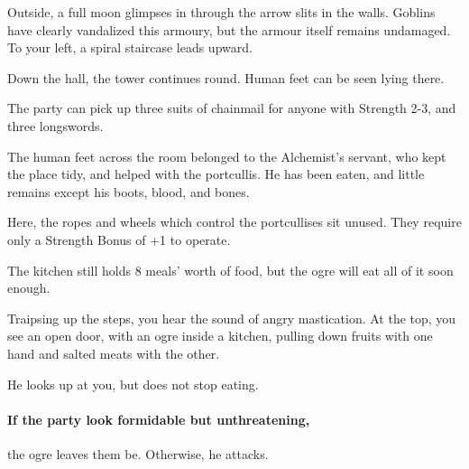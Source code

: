 \begin{multicols}{2}
\begin{boxtext}

  Outside, a full moon glimpses in through the arrow slits in the walls.
  Goblins have clearly vandalized this armoury, but the armour itself remains undamaged.
  To your left, a spiral staircase leads upward.

  Down the hall, the tower continues round.
  Human feet can be seen lying there.

\end{boxtext}


The party can pick up three suits of chainmail for anyone with Strength 2-3, and three longswords.

The human feet across the room belonged to the Alchemist's servant, who kept the place tidy, and helped with the portcullis.
He has been eaten, and little remains except his boots, blood, and bones.


Here, the ropes and wheels which control the portcullises sit unused.
They require only a Strength Bonus of +1 to operate.


The kitchen still holds 8 meals' worth of food, but the ogre will eat all of it soon enough.

\begin{boxtext}

  Traipsing up the steps, you hear the sound of angry mastication.
  At the top, you see an open door, with an ogre inside a kitchen, pulling down fruits with one hand and salted meats with the other.

  He looks up at you, but does not stop eating.

\end{boxtext}

\paragraph{If the party look formidable but unthreatening,}
the ogre leaves them be.
Otherwise, he attacks.



\end{multicols}
